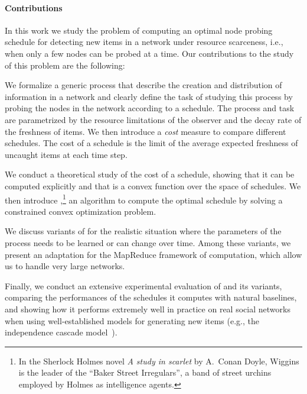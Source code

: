
\paragraph*{Contributions}
In this work we study the problem of computing an optimal node probing schedule
for detecting new items in a network under resource scarceness, i.e., when only
a few nodes can be probed at a time. Our contributions to the study of this
problem are the following:

\begin{itemize*}
	\item We formalize a generic process that describe the creation and
		distribution of information in a network and clearly define the task of
		studying this process by probing the nodes in the network according to a
		schedule. The process and task are parametrized by the resource
		limitations of the observer and the decay rate of the freshness of
		items. We then introduce a \emph{cost} measure to compare different
		schedules. The cost of a schedule is the limit of the average expected
		freshness of uncaught items at each time step.
	\item We conduct a theoretical study of the cost of a schedule, showing that
		it can be computed explicitly and that is a convex function over the
		space of schedules. We then introduce \algoname,\footnote{In the Sherlock
			Holmes novel \emph{A study in scarlet} by A.~Conan Doyle, Wiggins is
			the leader of the ``Baker Street Irregulars'', a band of street
			urchins employed by Holmes as intelligence agents.} an algorithm to
		compute the optimal schedule by solving a constrained convex
		optimization problem.
	\item We discuss variants of \algoname for the realistic situation where
		the parameters of the process needs to be learned or can change over
		time. Among these variants, we present an adaptation for the MapReduce
		framework of computation, which allow us to handle very large networks.
	\item Finally, we conduct an extensive experimental evaluation of \algoname
		and its variants, comparing the performances of the schedules it
		computes with natural baselines, and showing how it performs extremely
		well in practice on real social networks when using well-established
		models for generating new items (e.g., the independence cascade
		model~\citemissing).
\end{itemize*}

